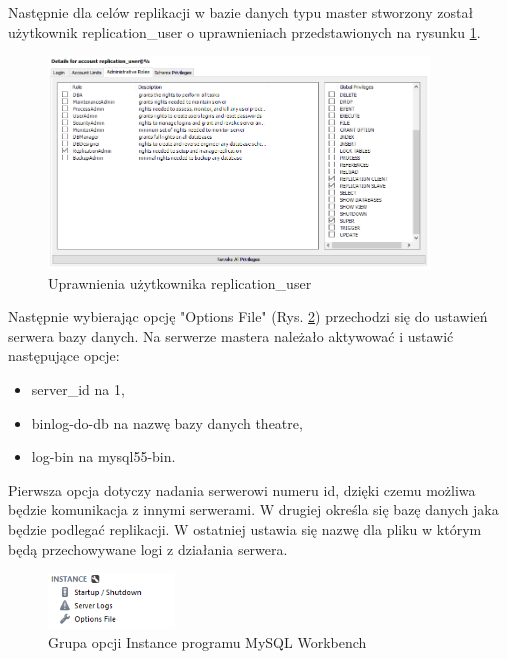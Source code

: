 \documentclass{mgr}
\begin{document}
Następnie dla celów replikacji w bazie danych typu master stworzony został użytkownik replication\_user o uprawnieniach przedstawionych na rysunku \ref{fig:wb-users-privileges}.

\begin{figure}[!ht]
	\centering
	\includegraphics[width=0.9\textwidth]{images/wb_users_privileges.png}
	\caption{Uprawnienia użytkownika replication\_user}
	\label{fig:wb-users-privileges}
\end{figure}

Następnie wybierając opcję "Options File" (Rys. \ref{fig:wb-instance}) przechodzi się do ustawień serwera bazy danych. Na serwerze mastera należało aktywować i ustawić następujące opcje:

\begin{itemize}
	\item server\_id na 1,
	\item binlog-do-db na nazwę bazy danych theatre,
	\item log-bin na mysql55-bin.
\end{itemize}

Pierwsza opcja dotyczy nadania serwerowi numeru id, dzięki czemu możliwa będzie komunikacja z innymi serwerami. W drugiej określa się bazę danych jaka będzie podlegać replikacji. W ostatniej ustawia się nazwę dla pliku w którym będą przechowywane logi z działania serwera.

\begin{figure}[!ht]
	\centering
	\includegraphics[width=0.3\textwidth]{images/wb_instance.png}
	\caption{Grupa opcji Instance programu MySQL Workbench}
	\label{fig:wb-instance}
\end{figure}
\end{document}
